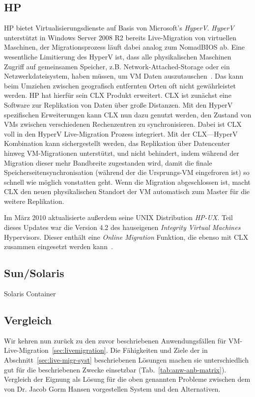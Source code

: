 \subsection{HP}
HP bietet Virtualisierungsdienste auf Basis von Microsoft's
\emph{HyperV}. \emph{HyperV} unterstützt in Windows Server 2008 R2
bereits Live-Migration von virtuellen Maschinen, der Migrationsprozess
läuft dabei analog zum NomadBIOS ab. Eine wesentliche Limitierung des
HyperV ist, dass alle physikalischen Maschinen Zugriff auf gemeinsamen
Speicher, z.B. Network-Attached-Storage oder ein Netzwerkdateisystem,
haben müssen, um \ac{VM} Daten auszutauschen~\cite{hp2010hyperV}. Das kann
beim Umziehen zwischen geografisch entfernten Orten oft nicht
gewährleistet werden. HP hat hierfür sein \ac{CLX} Produkt
erweitert. \ac{CLX} ist zunächst eine Software zur Replikation von Daten
über große Distanzen. Mit den HyperV spezifischen Erweiterungen kann
\ac{CLX} nun dazu genutzt werden, den Zustand von \ac{VM}s zwischen
verschiedenen Rechenzentren zu synchronisieren. Dabei ist \ac{CLX} voll in
den HyperV Live-Migration Prozess integriert. Mit der \ac{CLX}---HyperV
Kombination kann sichergestellt werden, das Replikation über
Datencenter hinweg \ac{VM}-Migrationen unterstützt, und nicht behindert,
indem während der Migration dieser mehr Bandbreite zugestanden wird,
damit die finale Speicherseitensynchronisation (während der die
Ursprungs-\ac{VM} eingefroren ist) so schnell wie möglich vonstatten
geht. Wenn die Migration abgeschlossen ist, macht \ac{CLX} den neuen
physikalischen Standort der \ac{VM} automatisch zum Master für die weitere
Replikation.

Im März 2010 aktualisierte außerdem seine UNIX Distribution
\emph{HP-UX}. Teil dieses Updates war die Version 4.2 des hauseigenen
\emph{Integrity Virtual Machines} Hypervisors. Dieser enthält eine
\emph{Online Migration} Funktion, die ebenso mit \ac{CLX} zusammen
eingesetzt werden kann~\cite{hp2010integrity}.

\subsection{Sun/Solaris}
Solaris Container

\subsection{Vergleich}
Wir kehren nun zurück zu den zuvor beschriebenen Anwendungsfällen für
\ac{VM}-Live-Migration~\ref{sec:livemigration}. Die Fähigkeiten und Ziele
der in Abschnitt~\ref{sec:live-migr-syst} beschriebenen Lösungen
machen sie unterschiedlich gut für die beschriebenen Zwecke
einsetzbar (Tab.~\ref{tab:anw-anb-matrix}).
Vergleich der Eignung als Lösung für die oben genannten Probleme
zwischen dem von Dr. Jacob Gorm Hansen vorgestellen System und den Alternativen.

